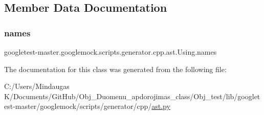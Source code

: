 \subsection{Member Data Documentation}
\mbox{\label{classgoogletest-master_1_1googlemock_1_1scripts_1_1generator_1_1cpp_1_1ast_1_1_using_a3f106e80f20e457134de9dd31e3dd1f1}} 
\subsubsection{\texorpdfstring{names}{names}}
{\footnotesize\ttfamily googletest-\/master.\+googlemock.\+scripts.\+generator.\+cpp.\+ast.\+Using.\+names}



The documentation for this class was generated from the following file\+:\begin{DoxyCompactItemize}
\item 
C\+:/\+Users/\+Mindaugas K/\+Documents/\+Git\+Hub/\+Obj\+\_\+\+Duomenu\+\_\+apdorojimas\+\_\+class/\+Obj\+\_\+test/lib/googletest-\/master/googlemock/scripts/generator/cpp/\mbox{\hyperlink{_obj__test_2lib_2googletest-master_2googlemock_2scripts_2generator_2cpp_2ast_8py}{ast.\+py}}\end{DoxyCompactItemize}
